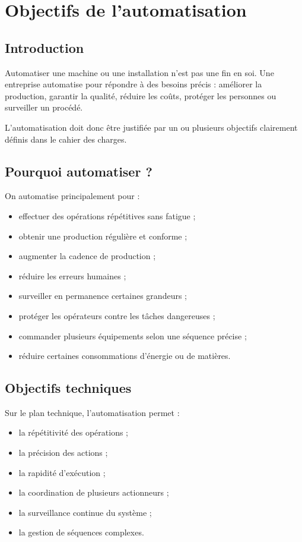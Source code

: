 \section{Objectifs de l'automatisation}

\subsection{Introduction}

Automatiser une machine ou une installation n'est pas une fin en soi. Une entreprise automatise pour répondre à des besoins précis : améliorer la production, garantir la qualité, réduire les coûts, protéger les personnes ou surveiller un procédé.

L'automatisation doit donc être justifiée par un ou plusieurs objectifs clairement définis dans le cahier des charges.

\subsection{Pourquoi automatiser ?}

On automatise principalement pour :

\begin{itemize}
    \item effectuer des opérations répétitives sans fatigue ;
    \item obtenir une production régulière et conforme ;
    \item augmenter la cadence de production ;
    \item réduire les erreurs humaines ;
    \item surveiller en permanence certaines grandeurs ;
    \item protéger les opérateurs contre les tâches dangereuses ;
    \item commander plusieurs équipements selon une séquence précise ;
    \item réduire certaines consommations d'énergie ou de matières.
\end{itemize}

\subsection{Objectifs techniques}

Sur le plan technique, l'automatisation permet :

\begin{itemize}
    \item la répétitivité des opérations ;
    \item la précision des actions ;
    \item la rapidité d'exécution ;
    \item la coordination de plusieurs actionneurs ;
    \item la surveillance continue du système ;
    \item la gestion de séquences complexes.
\end{itemize}

